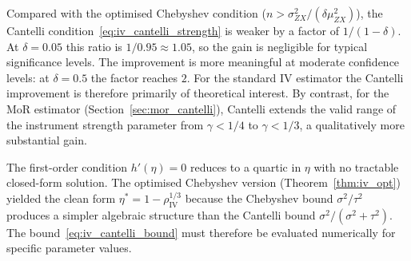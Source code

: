 \begin{remark}
\label{rem:cantelli_gain}
    Compared with the optimised Chebyshev condition ($n>\sigma_{ZX}^2/(\delta\mu_{ZX}^2)$), the Cantelli condition~\eqref{eq:iv_cantelli_strength} is weaker by a factor of $1/(1-\delta)$. At $\delta=0.05$ this ratio is $1/0.95\approx 1.05$, so the gain is negligible for typical significance levels. The improvement is more meaningful at moderate confidence levels: at $\delta=0.5$ the factor reaches $2$. For the standard IV estimator the Cantelli improvement is therefore primarily of theoretical interest. By contrast, for the MoR estimator (Section~\ref{sec:mor_cantelli}), Cantelli extends the valid range of the instrument strength parameter from $\gamma<1/4$ to $\gamma<1/3$, a qualitatively more substantial gain.
\end{remark}

\begin{remark}
    \label{rem:cantelli_noform}
    The first-order condition $h'(\eta)=0$ reduces to a quartic in $\eta$ with no tractable closed-form solution. The optimised Chebyshev version (Theorem~\ref{thm:iv_opt}) yielded the clean form $\eta^*=1-\rho_\mathrm{IV}^{1/3}$ because the Chebyshev bound $\sigma^2/\tau^2$ produces a simpler algebraic structure than the Cantelli bound $\sigma^2/(\sigma^2+\tau^2)$. The bound~\eqref{eq:iv_cantelli_bound} must therefore be evaluated numerically for specific parameter values.
\end{remark}

